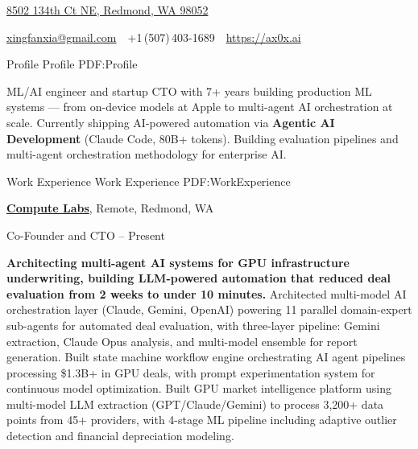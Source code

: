\documentclass[a4paper,MMMyyyy,nonstopmode]{simpleresumecv}
\newcommand{\CVAuthor}{Xingfan Xia}
\newcommand{\CVWebpage}{https://ax0x.ai}
\begin{document}

\Title{\CVAuthor}

\begin{SubTitle}
\href{https://www.google.com/maps/place/8502+134th+Ct+NE,+Redmond,+WA+98052}
{8502 134th Ct NE, Redmond, WA 98052}
\par
\href{mailto:xingfanxia@gmail.com}
{xingfanxia@gmail.com}
\,\SubBulletSymbol\,
+1\,(507)\,403-1689
\,\SubBulletSymbol\,
\href{\CVWebpage}
{\url{\CVWebpage}}
\end{SubTitle}

\begin{Body}

\Section
{Profile}
{Profile}
{PDF:Profile}

\Entry
ML/AI engineer and startup CTO with 7+ years building production ML systems --- from on-device models at Apple to multi-agent AI orchestration at scale. Currently shipping AI-powered automation via \textbf{Agentic AI Development} (Claude Code, 80B+ tokens). Building evaluation pipelines and multi-agent orchestration methodology for enterprise AI.

\BigGap


\Section
{Work\newline
Experience}
{Work Experience}
{PDF:WorkExperience}

\Entry
\href{https://computelabs.ai/}
{\textbf{Compute Labs}},
Remote, Redmond, WA

\Gap
\BulletItem
Co-Founder and CTO
\hfill
{} --
Present
\begin{Detail}
\SubBulletItem
\textbf{Architecting multi-agent AI systems for GPU infrastructure underwriting, building LLM-powered automation that reduced deal evaluation from 2 weeks to under 10 minutes.}
\SubBulletItem
Architected multi-model AI orchestration layer (Claude, Gemini, OpenAI) powering 11 parallel domain-expert sub-agents for automated deal evaluation, with three-layer pipeline: Gemini extraction, Claude Opus analysis, and multi-model ensemble for report generation.
\SubBulletItem
Built state machine workflow engine orchestrating AI agent pipelines processing \$1.3B+ in GPU deals, with prompt experimentation system for continuous model optimization.
\SubBulletItem
Built GPU market intelligence platform using multi-model LLM extraction (GPT/Claude/Gemini) to process 3,200+ data points from 45+ providers, with 4-stage ML pipeline including adaptive outlier detection and financial depreciation modeling.
\end{Detail}


\end{Body}
\end{document}
